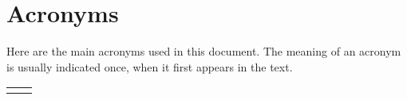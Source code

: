 

\chapter*{Acronyms}

Here are the main acronyms used in this document. The meaning of an acronym is usually indicated once, when it first appears in the text. 

\begin{longtable}{lp{11cm}}
  &\\
 
\end{longtable}
